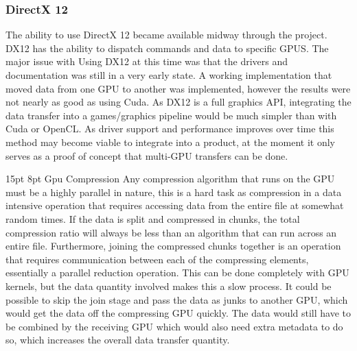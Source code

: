 \documentclass[12pt,a4paper]{article}
\makeatletter
\renewcommand\subsection{\@startsection {subsection}{1}{2mm} %
                               {15pt} %
                               {8pt} %
                               {\fontsize{13pt}{1em}\bfseries}}
\makeatother
\begin{document}
\subsubsection{DirectX 12}
The ability to use DirectX 12 became available midway through the project. DX12 has the ability to dispatch commands and data to specific GPUS. The major issue with Using DX12 at this time was that the drivers and documentation was still in a very early state. A working implementation that moved data from one GPU to another was implemented, however the results were not nearly as good as using Cuda. 
As DX12 is a full graphics API, integrating the data transfer into a games/graphics pipeline would be much simpler than with Cuda or OpenCL. As driver support and performance improves over time this method may become viable to integrate into a product, at the moment it only serves as a proof of concept that multi-GPU transfers can be done.



\subsection{Gpu Compression}
Any compression algorithm that runs on the GPU must be a highly parallel in nature, this is a hard task as compression in a data intensive operation that requires accessing data from the entire file at somewhat random times. If the data is split and compressed in chunks, the total compression ratio will always be less than an algorithm that can run across an entire file. Furthermore, joining the compressed chunks together is an operation that requires communication between each of the compressing elements, essentially a parallel reduction operation. This can be done completely with GPU kernels, but the data quantity involved makes this a slow process. It could be possible to skip the join stage and pass the data as junks to another GPU, which would get the data off the compressing GPU quickly. The data would still have to be combined by the receiving GPU which would also need extra metadata to do so, which increases the overall data transfer quantity. 
\end{document}
